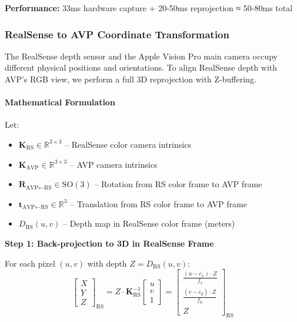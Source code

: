 \textbf{Performance:} 33ms hardware capture + 20-50ms reprojection ≈ 50-80ms total

\subsubsection{RealSense to AVP Coordinate Transformation}
\label{sec:realsense_transform}

The RealSense depth sensor and the Apple Vision Pro main camera occupy different physical positions and orientations. To align RealSense depth with AVP's RGB view, we perform a full 3D reprojection with Z-buffering.

\paragraph{Mathematical Formulation}

Let:
\begin{itemize}
    \item $\mathbf{K}_{\text{RS}} \in \mathbb{R}^{3 \times 3}$ -- RealSense color camera intrinsics
    \item $\mathbf{K}_{\text{AVP}} \in \mathbb{R}^{3 \times 3}$ -- AVP camera intrinsics
    \item $\mathbf{R}_{\text{AVP←RS}} \in \text{SO}(3)$ -- Rotation from RS color frame to AVP frame
    \item $\mathbf{t}_{\text{AVP←RS}} \in \mathbb{R}^3$ -- Translation from RS color frame to AVP frame
    \item $D_{\text{RS}}(u, v)$ -- Depth map in RealSense color frame (meters)
\end{itemize}

\textbf{Step 1: Back-projection to 3D in RealSense Frame}

For each pixel $(u, v)$ with depth $Z = D_{\text{RS}}(u, v)$:
\[
\begin{bmatrix} X \\ Y \\ Z \end{bmatrix}_{\text{RS}}
= Z \cdot \mathbf{K}_{\text{RS}}^{-1} \begin{bmatrix} u \\ v \\ 1 \end{bmatrix}
= \begin{bmatrix}
\frac{(u - c_x) \cdot Z}{f_x} \\
\frac{(v - c_y) \cdot Z}{f_y} \\
Z
\end{bmatrix}_{\text{RS}}
\]


